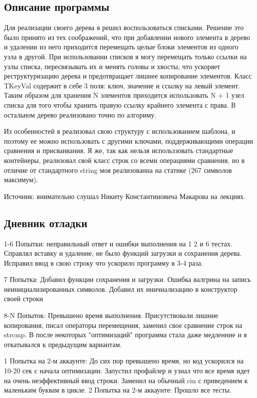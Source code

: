\documentclass[12pt]{article}
\begin{document}
\subsection*{Описание программы}

Для реализации своего дерева я решил воспользоваться списками. Решение это было принято из тех соображений, что при добавлении нового элемента в дерево и удалении из него приходится перемещать целые блоки элементов из одного узла в другой. При использовании списков я могу перемещать только ссылки на узлы списка, пересвязывать их и менять головы и хвосты, что ускоряет реструктуризацию дерева и предотвращает лишнее копирование элементов. Класс TKeyVal содержит в себе 3 поля: ключ, значение и ссылку на левый элемент. Таким образом для хранения N  элементов приходится использовать N + 1 узел списка для того чтобы хранить правую ссылку крайнего элемента с права. В остальном дерево реализовано точно по алгориму. 

Из особенностей я реализовал свою структуру с использованием шаблона, и поэтому ее можно использовать с другими ключами, поддерживающими операции сравнения и присваивания. Я же, так как нельзя использзовать стандартные контейнеры, реализовал свой класс строк со всеми операциями сравнения, но в отличие от стандартного string моя реализованна на статике (267 символов максимум).

Источник: внимательно слушал Никиту Константиновича Макарова на лекциях.

\subsection*{Дневник отладки}

1-6 Попытки: неправильный ответ и ошибки выполнения на 1 2 и 6 тестах. Справлял вставку и удаление, не было функций загрузки и сохранения дерева. Исправил ввод в свою строку что ускорило программу в 3-4 раза.

7 Попытка: Добавил функции сохранения и загрузки. Ошибка валгрина на запись неинициализированных символов. Добавил их иничиализацию в конструктор своей строки

8-N Попыток: Превышено время выполнения. Присутствовали лишние копирования, писал операторы перемещения, заменил свое сравнение строк на strcmp. В после некоторых "оптимизаций" программа стала даже медленние и я откатывался к предыдущим вариантам. 

1 Попытка на 2-м аккаунте: До сих пор превышено время, но код ускорился на 10-20 сек с начала оптимизации. Запустил профайлер и узнал что все время идет на очень неэффективный ввод строки. Заменил на обычный cin с приведением к маленьким буквам в цикле.
2 Попытка на 2-м аккаунте: Прошло все тесты.
\end{document}
